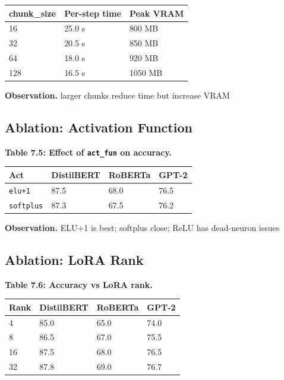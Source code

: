 \begin{table}[H]
\centering
\small
\begin{tabular}{lll}
\toprule
\textbf{chunk\_size} & \textbf{Per-step time} & \textbf{Peak VRAM} \\
\midrule
16 & 25.0 s & 800 MB \\
32 & 20.5 s & 850 MB \\
64 & 18.0 s & 920 MB \\
128 & 16.5 s & 1050 MB \\
\bottomrule
\end{tabular}
\end{table}

\textbf{Observation.} larger chunks reduce time but increase VRAM

\subsection{Ablation: Activation Function}

\textbf{Table 7.5: Effect of \texttt{act\_fun} on accuracy.}

\begin{table}[H]
\centering
\small
\begin{tabular}{llll}
\toprule
\textbf{Act} & \textbf{DistilBERT} & \textbf{RoBERTa} & \textbf{GPT-2} \\
\midrule
\texttt{elu+1} & 87.5 & 68.0 & 76.5 \\
\texttt{softplus} & 87.3 & 67.5 & 76.2 \\
\bottomrule
\end{tabular}
\end{table}

\textbf{Observation.} ELU+1 is best; softplus close; ReLU has dead-neuron issues

\subsection{Ablation: LoRA Rank}

\textbf{Table 7.6: Accuracy vs LoRA rank.}

\begin{table}[H]
\centering
\small
\begin{tabular}{llll}
\toprule
\textbf{Rank} & \textbf{DistilBERT} & \textbf{RoBERTa} & \textbf{GPT-2} \\
\midrule
4 & 85.0 & 65.0 & 74.0 \\
8 & 86.5 & 67.0 & 75.5 \\
16 & 87.5 & 68.0 & 76.5 \\
32 & 87.8 & 69.0 & 76.7 \\
\bottomrule
\end{tabular}
\end{table}

